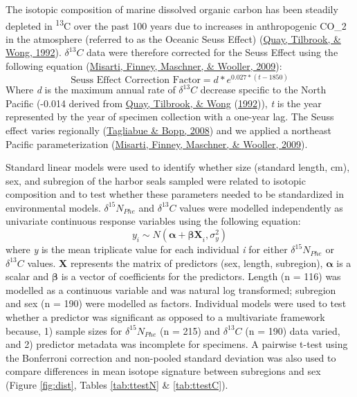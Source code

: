\documentclass [11pt, proquest] {uwthesis}[2015/03/03]
\begin{document}
The isotopic composition of marine dissolved organic carbon has been steadily depleted in \textsuperscript{13}C over the past 100 years due to increases in anthropogenic CO\_2 in the atmosphere (referred to as the Oceanic Seuss Effect) (\protect\hyperlink{ref-Quay1992}{Quay, Tilbrook, \& Wong, 1992}). \(\delta^{13}C\) data were therefore corrected for the Seuss Effect using the following equation (\protect\hyperlink{ref-Misarti2009}{Misarti, Finney, Maschner, \& Wooller, 2009}):
\begin{equation} 
 \mbox {Seuss Effect Correction Factor} =   
  d * e^{0.027*(t-1850)}
  \label{eq:seuss}
\end{equation}
Where \emph{d} is the maximum annual rate of \(\delta^{13}C\) decrease specific to the North Pacific (-0.014 derived from \protect\hyperlink{ref-Quay1992}{Quay, Tilbrook, \& Wong} (\protect\hyperlink{ref-Quay1992}{1992})), \emph{t} is the year represented by the year of specimen collection with a one-year lag. The Seuss effect varies regionally (\protect\hyperlink{ref-Tagliabue2008}{Tagliabue \& Bopp, 2008}) and we applied a northeast Pacific parameterization (\protect\hyperlink{ref-Misarti2009}{Misarti, Finney, Maschner, \& Wooller, 2009}).

Standard linear models were used to identify whether size (standard length, cm), sex, and subregion of the harbor seals sampled were related to isotopic composition and to test whether these parameters needed to be standardized in environmental models. \(\delta^{15}N_{Phe}\) and \(\delta^{13}C\) values were modelled independently as univariate continuous response variables using the following equation:
\begin{equation} 
 y_i \sim N(\boldsymbol{\alpha} + \boldsymbol{\beta X}_i, \sigma^2_y)
  \label{eq:linmods}
\end{equation}
where \emph{y} is the mean triplicate value for each individual \emph{i} for either \(\delta^{15}N_{Phe}\) or \(\delta^{13}C\) values. \textbf{X} represents the matrix of predictors (sex, length, subregion), \(\boldsymbol{\alpha}\) is a scalar and \(\boldsymbol{\beta}\) is a vector of coefficients for the predictors. Length (n = 116) was modelled as a continuous variable and was natural log transformed; subregion and sex (n = 190) were modelled as factors. Individual models were used to test whether a predictor was significant as opposed to a multivariate framework because, 1) sample sizes for \(\delta^{15}N_{Phe}\) (n = 215) and \(\delta^{13}C\) (n = 190) data varied, and 2) predictor metadata was incomplete for specimens. A pairwise t-test using the Bonferroni correction and non-pooled standard deviation was also used to compare differences in mean isotope signature between subregions and sex (Figure \ref{fig:dist}, Tables \ref{tab:ttestN} \& \ref{tab:ttestC}).
\end{document}
